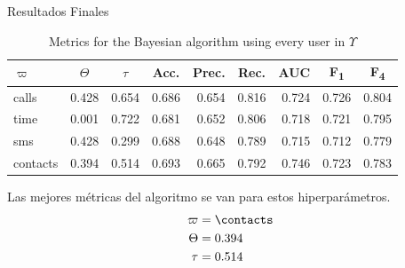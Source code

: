 \documentclass[usenames,dvipsnames,table]{beamer}
\newcommand{\ct}[1]{\multicolumn{1}{c}{#1}}
\begin{document}
\begin{frame}{Resultados Finales}
	\begin{table}
		\begin{tabular}{l r r r r r r r r}
			\toprule
			$\varpi$ & \ct{$\Theta$} & \ct{$\tau$} & \ct{Acc.} & \ct{Prec.} & \ct{Rec.} & \ct{AUC} & \ct{F\textsubscript{1}} & \ct{F\textsubscript{4}} \\
			\midrule
			calls    & 0.428 & 0.654 & 0.686 & 0.654 & 0.816 & 0.724 & 0.726 & 0.804 \\
			time     & 0.001 & 0.722 & 0.681 & 0.652 & 0.806 & 0.718 & 0.721 & 0.795 \\
			sms      & 0.428 & 0.299 & 0.688 & 0.648 & 0.789 & 0.715 & 0.712 & 0.779 \\
			contacts & 0.394 & 0.514 & 0.693 & 0.665 & 0.792 & 0.746 & 0.723 & 0.783 \\
			\bottomrule
		\end{tabular}
		\caption{Metrics for the Bayesian algorithm using every user in $\Upsilon$}
	\end{table}

	\pause{}
	Las mejores métricas del algoritmo se van para estos hiperparámetros.
	\begin{align*}
		\varpi &= \contacts \\
		\Theta &= 0.394 \\
		\tau &= 0.514
	\end{align*}
\end{frame}
\end{document}
